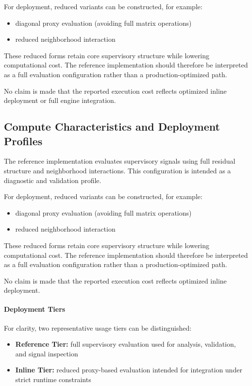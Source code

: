 \documentclass[11pt,letterpaper]{article}
\theoremstyle{gcresult}
\theoremstyle{definition}
\begin{document}
For deployment, reduced variants can be constructed, for example:
\begin{itemize}
    \item diagonal proxy evaluation (avoiding full matrix operations)
    \item reduced neighborhood interaction
\end{itemize}

These reduced forms retain core supervisory structure while lowering computational cost. The reference implementation should therefore be interpreted as a full evaluation configuration rather than a production-optimized path.

No claim is made that the reported execution cost reflects optimized inline deployment or full engine integration.



\subsection{Compute Characteristics and Deployment Profiles}

The reference implementation evaluates supervisory signals using full residual structure and neighborhood interactions. This configuration is intended as a diagnostic and validation profile.

For deployment, reduced variants can be constructed, for example:
\begin{itemize}
    \item diagonal proxy evaluation (avoiding full matrix operations)
    \item reduced neighborhood interaction
\end{itemize}

These reduced forms retain core supervisory structure while lowering computational cost. The reference implementation should therefore be interpreted as a full evaluation configuration rather than a production-optimized path.

No claim is made that the reported execution cost reflects optimized inline deployment.

\paragraph{Deployment Tiers}
For clarity, two representative usage tiers can be distinguished:
\begin{itemize}
    \item \textbf{Reference Tier:} full supervisory evaluation used for analysis, validation, and signal inspection
    \item \textbf{Inline Tier:} reduced proxy-based evaluation intended for integration under strict runtime constraints
\end{itemize}
\end{document}
